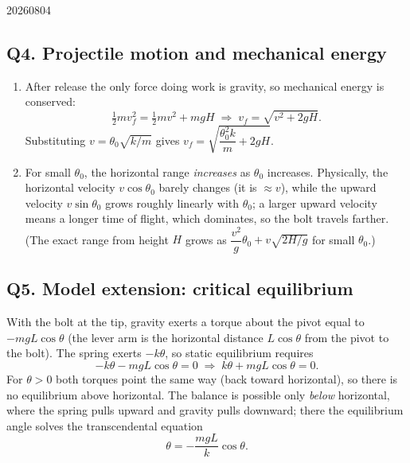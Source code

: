 \begin{solution}{20260804}
\subsection*{Q4. Projectile motion and mechanical energy}

\begin{enumerate}[label=\roman*.]
  \item After release the only force doing work is gravity, so mechanical energy is conserved:
  \[
    \tfrac{1}{2}mv_{f}^{2} = \tfrac{1}{2}mv^{2} + mgH
    \;\Longrightarrow\;
    \boxed{v_{f} = \sqrt{v^{2} + 2gH}}.
  \]
  Substituting $v = \theta_{0}\sqrt{k/m}$ gives $v_{f} = \sqrt{\dfrac{\theta_{0}^{2}k}{m} + 2gH}$.

  \item For small $\theta_{0}$, the horizontal range \emph{increases} as $\theta_{0}$ increases.  Physically, the horizontal velocity $v\cos\theta_{0}$ barely changes (it is $\approx v$), while the upward velocity $v\sin\theta_{0}$ grows roughly linearly with $\theta_{0}$; a larger upward velocity means a longer time of flight, which dominates, so the bolt travels farther.  (The exact range from height $H$ grows as $\dfrac{v^{2}}{g}\theta_{0} + v\sqrt{2H/g}$ for small $\theta_{0}$.)
\end{enumerate}

\subsection*{Q5. Model extension: critical equilibrium}

With the bolt at the tip, gravity exerts a torque about the pivot equal to $-mgL\cos\theta$ (the lever arm is the horizontal distance $L\cos\theta$ from the pivot to the bolt).  The spring exerts $-k\theta$, so static equilibrium requires
\[
  -k\theta - mgL\cos\theta = 0
  \;\Longrightarrow\;
  \boxed{k\theta + mgL\cos\theta = 0}.
\]
For $\theta > 0$ both torques point the same way (back toward horizontal), so there is no equilibrium above horizontal.  The balance is possible only \emph{below} horizontal, where the spring pulls upward and gravity pulls downward; there the equilibrium angle solves the transcendental equation
\[
  \boxed{\theta = -\frac{mgL}{k}\cos\theta}.
\]

\end{solution}


